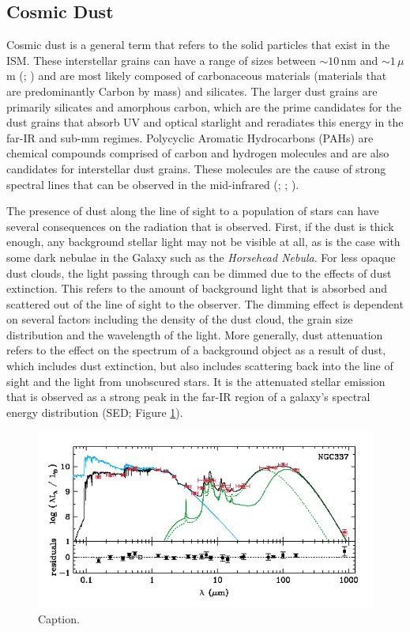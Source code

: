 \subsection{Cosmic Dust}

Cosmic dust is a general term that refers to the solid particles that exist in the ISM. These interstellar grains can have a range of sizes between $\sim 10\,$nm and $\sim 1\,\mu$m (\citealt{Kim_1994}; \citealt{Galliano_2018}) and are most likely composed of carbonaceous materials (materials that are predominantly Carbon by mass) and silicates. The larger dust grains are primarily silicates and amorphous carbon, which are the prime candidates for the dust grains that absorb UV and optical starlight and reradiates this energy in the far-IR and sub-mm regimes. Polycyclic Aromatic Hydrocarbons (PAHs) are chemical compounds comprised of carbon and hydrogen molecules and are also candidates for interstellar dust grains. These molecules are the cause of strong spectral lines that can be observed in the mid-infrared (\citealt{Tielens_1987}; \citealt{Draine_2007a}; \citealt{Draine_2007b}).

The presence of dust along the line of sight to a population of stars can have several consequences on the radiation that is observed. First, if the dust is thick enough, any background stellar light may not be visible at all, as is the case with some dark nebulae in the Galaxy such as the \textit{Horsehead Nebula}. For less opaque dust clouds, the light passing through can be dimmed due to the effects of dust extinction. This refers to the amount of background light that is absorbed and scattered out of the line of sight to the observer. The dimming effect is dependent on several factors including the density of the dust cloud, the grain size distribution and the wavelength of the light. More generally, dust attenuation refers to the effect on the spectrum of a background object as a result of dust, which includes dust extinction, but also includes scattering back into the line of sight and the light from unobscured stars. It is the attenuated stellar emission that is observed as a strong peak in the far-IR region of a galaxy's spectral energy distribution (SED; Figure \ref{fig:unattenuated_attenuated_sed}).

\begin{figure}
    \centering
	\includegraphics[width=0.9\columnwidth]{Figures/unattenuated_attenuated_sed.jpeg}
	\caption{{\color{red}Caption.} \citealt{daCunha_2008}}
	\label{fig:unattenuated_attenuated_sed}
\end{figure}

